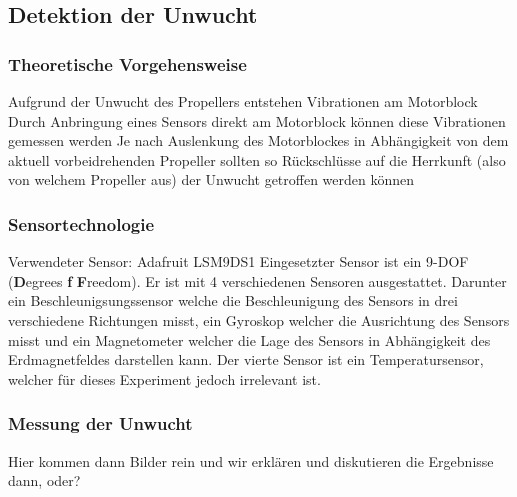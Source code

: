 
\subsection{Detektion der Unwucht}
\label{subsec:detektion_der_unwucht}

\subsubsection*{Theoretische Vorgehensweise}
Aufgrund der Unwucht des Propellers entstehen Vibrationen am Motorblock
Durch Anbringung eines Sensors direkt am Motorblock können diese Vibrationen gemessen werden
Je nach Auslenkung des Motorblockes in Abhängigkeit von dem aktuell vorbeidrehenden Propeller sollten so Rückschlüsse auf die Herrkunft (also von welchem Propeller aus) der Unwucht getroffen werden können

\subsubsection*{Sensortechnologie}
Verwendeter Sensor: Adafruit LSM9DS1
Eingesetzter Sensor ist ein 9-DOF (\textbf{D}egrees \textbf{f} \textbf{F}reedom). Er ist mit 4 verschiedenen Sensoren ausgestattet. Darunter ein Beschleunigsungssensor welche die Beschleunigung des Sensors in drei verschiedene Richtungen misst, ein Gyroskop welcher die Ausrichtung des Sensors misst und ein Magnetometer welcher die Lage des Sensors in Abhängigkeit des Erdmagnetfeldes darstellen kann. Der vierte Sensor ist ein Temperatursensor, welcher für dieses Experiment jedoch irrelevant ist.

\subsubsection*{Messung der Unwucht}
Hier kommen dann Bilder rein und wir erklären und diskutieren die Ergebnisse dann, oder?


